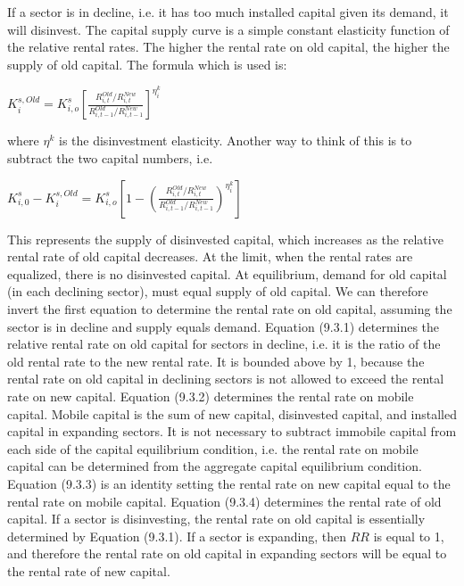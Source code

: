 \documentclass{article}
\begin{document}
If a sector is in decline, i.e. it has too much installed capital given its demand, it will disinvest. The capital supply curve is a simple constant elasticity function of the relative rental rates. The higher the rental rate on old capital, the higher the supply of old capital. The formula which is used is:

\begin{center}

$K^{s,Old}_i = K^s_{i, o}\left[\frac{R^{Old}_{i, t}/R^{New}_{i, t}}{R^{Old}_{i, t-1}/R^{New}_{i, t-1}}\right]^{\eta^k_i}$

\end{center}

where $\eta^k$ is the disinvestment elasticity. Another way to think of this is to subtract the two capital numbers, i.e.

\begin{center}

$K^s_{i, 0} - K^{s, Old}_i = K^s_{i, o}\left[1- \left(\frac{R^{Old}_{i, t}/R^{New}_{i, t}}{R^{Old}_{i, t-1}/R^{New}_{i, t-1}}\right)^{\eta^k_i}\right]$

\end{center}

This represents the supply of disinvested capital, which increases as the relative rental rate of old capital decreases. At the limit, when the rental rates are equalized, there is no disinvested capital. At equilibrium, demand for old capital (in each declining sector), must equal supply of old capital. We can therefore invert the first equation to determine the rental rate on old capital, assuming the sector is in decline and supply equals demand. Equation (9.3.1) determines the relative rental rate on old capital for sectors in decline, i.e. it is the ratio of the old rental rate to the new rental rate. It is bounded above by 1, because the rental rate on old capital in declining sectors is not allowed to exceed the rental rate on new capital.
Equation (9.3.2) determines the rental rate on mobile capital. Mobile capital is the sum of new capital, disinvested capital, and installed capital in expanding sectors. It is not necessary to subtract immobile capital from each side of the capital equilibrium condition, i.e. the rental rate on mobile capital can be determined from the aggregate capital equilibrium condition. Equation (9.3.3) is an identity setting the rental rate on new capital equal to the rental rate on mobile capital. Equation (9.3.4) determines the rental rate of old capital. If a sector is disinvesting, the rental rate on old capital is essentially determined by Equation (9.3.1). If a sector is expanding, then $RR$ is equal to 1, and therefore the rental rate on old capital in expanding sectors will be equal to the rental rate of new capital.
\end{document}
